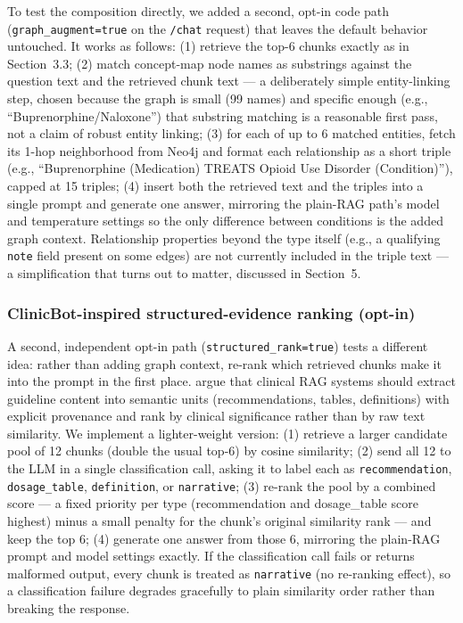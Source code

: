 \documentclass[11pt]{article}
\begin{document}
To test the composition directly, we added a second, opt-in code path (\texttt{graph\_augment=true} on the \texttt{/chat} request) that leaves the default behavior untouched. It works as follows: (1) retrieve the top-6 chunks exactly as in Section~3.3; (2) match concept-map node names as substrings against the question text and the retrieved chunk text --- a deliberately simple entity-linking step, chosen because the graph is small (99 names) and specific enough (e.g., ``Buprenorphine/Naloxone'') that substring matching is a reasonable first pass, not a claim of robust entity linking; (3) for each of up to 6 matched entities, fetch its 1-hop neighborhood from Neo4j and format each relationship as a short triple (e.g., ``Buprenorphine (Medication) TREATS Opioid Use Disorder (Condition)''), capped at 15 triples; (4) insert both the retrieved text and the triples into a single prompt and generate one answer, mirroring the plain-RAG path's model and temperature settings so the only difference between conditions is the added graph context. Relationship properties beyond the type itself (e.g., a qualifying \texttt{note} field present on some edges) are not currently included in the triple text --- a simplification that turns out to matter, discussed in Section~5.

\subsubsection*{ClinicBot-inspired structured-evidence ranking (opt-in)}

A second, independent opt-in path (\texttt{structured\_rank=true}) tests a different idea: rather than adding graph context, re-rank which retrieved chunks make it into the prompt in the first place. \citet{clinicbot2026} argue that clinical RAG systems should extract guideline content into semantic units (recommendations, tables, definitions) with explicit provenance and rank by clinical significance rather than by raw text similarity. We implement a lighter-weight version: (1) retrieve a larger candidate pool of 12 chunks (double the usual top-6) by cosine similarity; (2) send all 12 to the LLM in a single classification call, asking it to label each as \texttt{recommendation}, \texttt{dosage\_table}, \texttt{definition}, or \texttt{narrative}; (3) re-rank the pool by a combined score --- a fixed priority per type (recommendation and dosage\_table score highest) minus a small penalty for the chunk's original similarity rank --- and keep the top 6; (4) generate one answer from those 6, mirroring the plain-RAG prompt and model settings exactly. If the classification call fails or returns malformed output, every chunk is treated as \texttt{narrative} (no re-ranking effect), so a classification failure degrades gracefully to plain similarity order rather than breaking the response.
\end{document}
